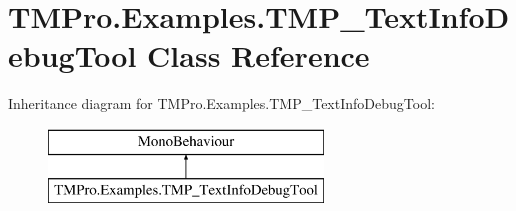 \hypertarget{class_t_m_pro_1_1_examples_1_1_t_m_p___text_info_debug_tool}{}\section{T\+M\+Pro.\+Examples.\+T\+M\+P\+\_\+\+Text\+Info\+Debug\+Tool Class Reference}
\label{class_t_m_pro_1_1_examples_1_1_t_m_p___text_info_debug_tool}
Inheritance diagram for T\+M\+Pro.\+Examples.\+T\+M\+P\+\_\+\+Text\+Info\+Debug\+Tool\+:\begin{figure}[H]
\begin{center}
\leavevmode
\includegraphics[height=2.000000cm]{class_t_m_pro_1_1_examples_1_1_t_m_p___text_info_debug_tool}
\end{center}
\end{figure}
